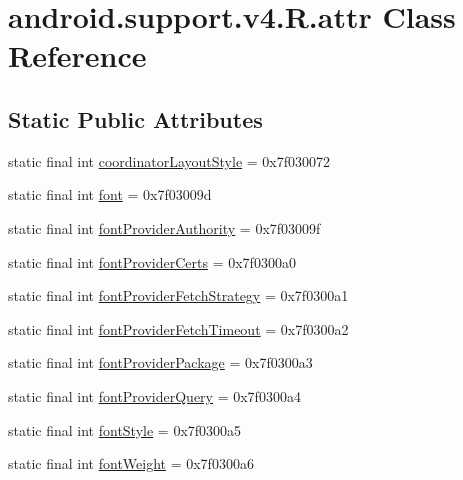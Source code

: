 \hypertarget{classandroid_1_1support_1_1v4_1_1_r_1_1attr}{}\section{android.\+support.\+v4.\+R.\+attr Class Reference}
\label{classandroid_1_1support_1_1v4_1_1_r_1_1attr}
\subsection*{Static Public Attributes}
\begin{DoxyCompactItemize}
\item 
static final int \mbox{\hyperlink{classandroid_1_1support_1_1v4_1_1_r_1_1attr_a5db35f80b8f3fca0907f24dc7765fd3c}{coordinator\+Layout\+Style}} = 0x7f030072
\item 
static final int \mbox{\hyperlink{classandroid_1_1support_1_1v4_1_1_r_1_1attr_a784b971c7ce1ca8f41748ba7abcc48f5}{font}} = 0x7f03009d
\item 
static final int \mbox{\hyperlink{classandroid_1_1support_1_1v4_1_1_r_1_1attr_a315bbcf1c1ea5d256a8db20f7cc269b5}{font\+Provider\+Authority}} = 0x7f03009f
\item 
static final int \mbox{\hyperlink{classandroid_1_1support_1_1v4_1_1_r_1_1attr_a4c9ba6ad273014bef1bbed0c4ad3b424}{font\+Provider\+Certs}} = 0x7f0300a0
\item 
static final int \mbox{\hyperlink{classandroid_1_1support_1_1v4_1_1_r_1_1attr_aa059957b6096ff95f22eff9f881656aa}{font\+Provider\+Fetch\+Strategy}} = 0x7f0300a1
\item 
static final int \mbox{\hyperlink{classandroid_1_1support_1_1v4_1_1_r_1_1attr_a9806e07c1ba436a8defba42227ff108e}{font\+Provider\+Fetch\+Timeout}} = 0x7f0300a2
\item 
static final int \mbox{\hyperlink{classandroid_1_1support_1_1v4_1_1_r_1_1attr_a162f73d436f42bce7e1ad651ebc93de9}{font\+Provider\+Package}} = 0x7f0300a3
\item 
static final int \mbox{\hyperlink{classandroid_1_1support_1_1v4_1_1_r_1_1attr_a7cbc384b3e4af24b660c51241bb88b2f}{font\+Provider\+Query}} = 0x7f0300a4
\item 
static final int \mbox{\hyperlink{classandroid_1_1support_1_1v4_1_1_r_1_1attr_a74882a15e37dacc0f0599dabe554eb82}{font\+Style}} = 0x7f0300a5
\item 
static final int \mbox{\hyperlink{classandroid_1_1support_1_1v4_1_1_r_1_1attr_a26d39aee68d62f1d658b6bdff21fbc76}{font\+Weight}} = 0x7f0300a6

\end{DoxyCompactItemize}
